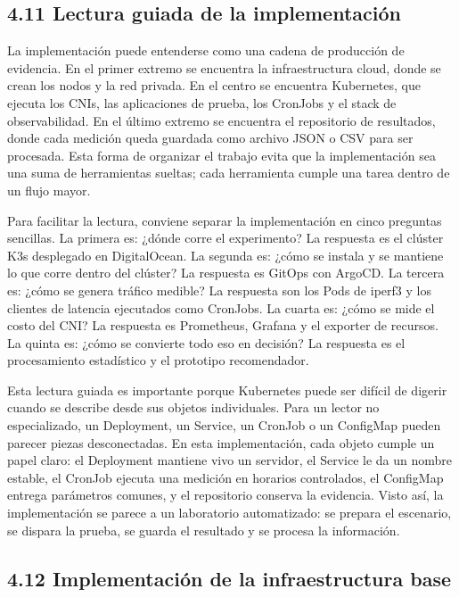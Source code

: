 \documentclass[journal]{IEEEtran}
\begin{document}

\subsection{4.11 Lectura guiada de la implementación}

La implementación puede entenderse como una cadena de producción de evidencia. En el primer extremo se encuentra la infraestructura cloud, donde se crean los nodos y la red privada. En el centro se encuentra Kubernetes, que ejecuta los CNIs, las aplicaciones de prueba, los CronJobs y el stack de observabilidad. En el último extremo se encuentra el repositorio de resultados, donde cada medición queda guardada como archivo JSON o CSV para ser procesada. Esta forma de organizar el trabajo evita que la implementación sea una suma de herramientas sueltas; cada herramienta cumple una tarea dentro de un flujo mayor.

Para facilitar la lectura, conviene separar la implementación en cinco preguntas sencillas. La primera es: ¿dónde corre el experimento? La respuesta es el clúster K3s desplegado en DigitalOcean. La segunda es: ¿cómo se instala y se mantiene lo que corre dentro del clúster? La respuesta es GitOps con ArgoCD. La tercera es: ¿cómo se genera tráfico medible? La respuesta son los Pods de iperf3 y los clientes de latencia ejecutados como CronJobs. La cuarta es: ¿cómo se mide el costo del CNI? La respuesta es Prometheus, Grafana y el exporter de recursos. La quinta es: ¿cómo se convierte todo eso en decisión? La respuesta es el procesamiento estadístico y el prototipo recomendador.

Esta lectura guiada es importante porque Kubernetes puede ser difícil de digerir cuando se describe desde sus objetos individuales. Para un lector no especializado, un Deployment, un Service, un CronJob o un ConfigMap pueden parecer piezas desconectadas. En esta implementación, cada objeto cumple un papel claro: el Deployment mantiene vivo un servidor, el Service le da un nombre estable, el CronJob ejecuta una medición en horarios controlados, el ConfigMap entrega parámetros comunes, y el repositorio conserva la evidencia. Visto así, la implementación se parece a un laboratorio automatizado: se prepara el escenario, se dispara la prueba, se guarda el resultado y se procesa la información.

\subsection{4.12 Implementación de la infraestructura base}
\end{document}
